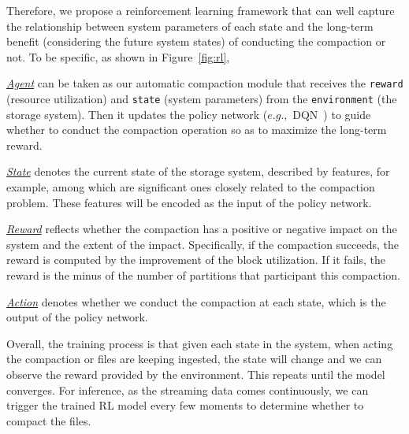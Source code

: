 Therefore, we propose a reinforcement learning framework that can well capture the relationship between system parameters of each state and the long-term benefit (considering the future system states) of conducting the compaction or not. 
To be specific, as shown in  Figure~\ref{fig:rl}, 

\noindent \underline{\textit{Agent}} can be taken as our automatic compaction module that receives the \texttt{reward} (resource utilization) and \texttt{state} (system parameters) from the \texttt{environment} (the storage system). Then it updates the policy network ($e.g.,$ DQN~\cite{}) to guide whether to conduct the compaction operation so as to maximize the long-term reward.

\noindent \underline{\textit{State}} denotes the current state of the storage system, described by  features, for example, among which  are significant ones closely  related to the compaction problem. These features will be encoded as the input of the policy network.

\noindent \underline{\textit{Reward}}  reflects whether the compaction  has a positive or negative impact on the system and the extent of the impact. Specifically, if the compaction succeeds, the reward is  computed by the improvement of the block utilization. If it fails, the reward is the minus of the number of partitions that participant this compaction.

\noindent \underline{\textit{Action}} denotes whether we conduct the compaction at each state, which is the output of the policy network.


Overall, the training process is that given each state in the system, when acting the compaction or files are keeping ingested, the state will change and we can observe the reward provided by the environment. This repeats until the model converges. For inference, as the streaming data comes continuously, we can trigger the trained RL model every few moments to determine whether to  compact the files.


